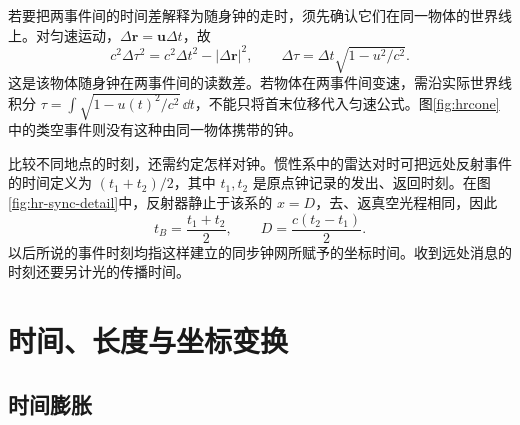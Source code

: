 若要把两事件间的时间差解释为随身钟的走时，须先确认它们在同一物体的世界线上。对匀速运动，$\Delta\bm r=\bm u\Delta t$，故
\[
c^2\Delta\tau^2=c^2\Delta t^2-|\Delta\bm r|^2,
\qquad \Delta\tau=\Delta t\sqrt{1-u^2/c^2}.
\]
这是该物体随身钟在两事件间的读数差。若物体在两事件间变速，需沿实际世界线积分 $\tau=\int\sqrt{1-u(t)^2/c^2}\,\dd t$，不能只将首末位移代入匀速公式。图\ref{fig:hrcone}中的类空事件则没有这种由同一物体携带的钟。

比较不同地点的时刻，还需约定怎样对钟。惯性系中的雷达对时可把远处反射事件的时间定义为 $(t_1+t_2)/2$，其中 $t_1,t_2$ 是原点钟记录的发出、返回时刻。在图\ref{fig:hr-sync-detail}中，反射器静止于该系的 $x=D$，去、返真空光程相同，因此
\[
t_B=\frac{t_1+t_2}{2},\qquad D=\frac{c(t_2-t_1)}2.
\]
以后所说的事件时刻均指这样建立的同步钟网所赋予的坐标时间。收到远处消息的时刻还要另计光的传播时间。

\section{时间、长度与坐标变换}

\subsection{时间膨胀}

